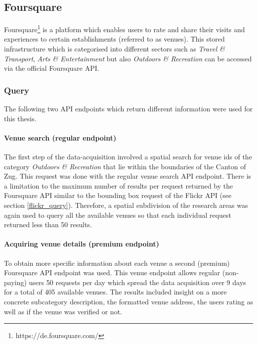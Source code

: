 \subsection{Foursquare} \label{foursquare}
Foursquare\footnote{https://de.foursquare.com/} is a platform which enables users to rate and share their visits and experiences to certain establishments (referred to as venues). This stored infrastructure which is categorised into different sectors such as \textit{Travel \& Transport}, \textit{Arts \& Entertainment} but also \textit{Outdoors \& Recreation} can be accessed via the official Foursquare API.

\subsubsection{Query} \label{foursquare_query}
The following two API endpoints which return different information were used for this thesis.
\paragraph*{Venue search (regular endpoint)} \label{foursquare_endpoint1}
The first step of the data-acquisition involved a spatial search for venue ids of the category \textit{Outdoors \& Recreation} that lie within the boundaries of the Canton of Zug. This request was done with the regular venue search API endpoint. There is a limitation to the maximum number of results per request returned by the Foursquare API similar to the bounding box request of the Flickr API (see section \ref{flickr_query}). Therefore, a spatial subdivision of the research areas was again used to query all the available venues so that each individual request returned less than 50 results.
\paragraph*{Acquiring venue details (premium endpoint)} \label{foursquare_endpoint2}
To obtain more specific information about each venue a second (premium) Foursquare API endpoint was used. This venue endpoint allows regular (non-paying) users 50 requests per day which spread the data acquisition over 9 days for a total of 405 available venues. The results included insight on a more concrete subcategory description, the formatted venue address, the users rating as well as if the venue was verified or not.

